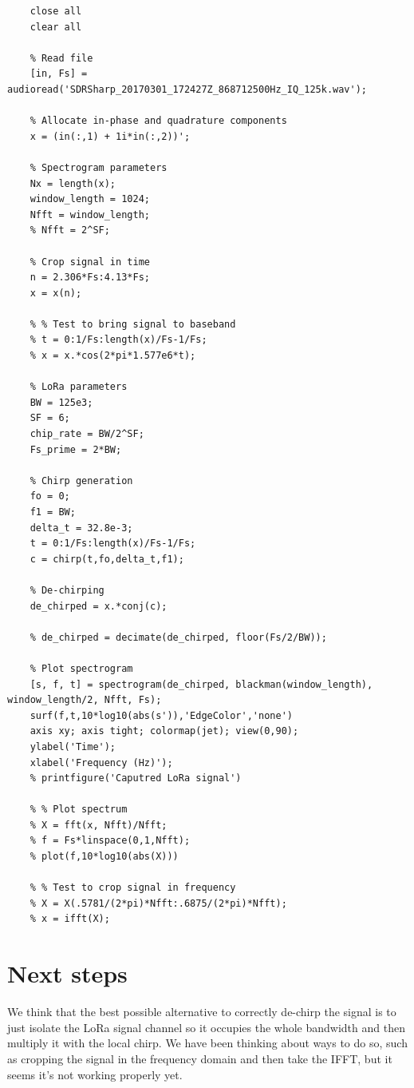 \documentclass{icmmcm}
\newenvironment{code}{\captionsetup{type=listing}}{}
\begin{document}
\begin{code}
\begin{verbatim}
    close all
    clear all
    
    % Read file
    [in, Fs] = audioread('SDRSharp_20170301_172427Z_868712500Hz_IQ_125k.wav');
    
    % Allocate in-phase and quadrature components
    x = (in(:,1) + 1i*in(:,2))';
    
    % Spectrogram parameters
    Nx = length(x);
    window_length = 1024;
    Nfft = window_length;
    % Nfft = 2^SF;
    
    % Crop signal in time
    n = 2.306*Fs:4.13*Fs;
    x = x(n);
    
    % % Test to bring signal to baseband
    % t = 0:1/Fs:length(x)/Fs-1/Fs;
    % x = x.*cos(2*pi*1.577e6*t);
    
    % LoRa parameters
    BW = 125e3;
    SF = 6;
    chip_rate = BW/2^SF;
    Fs_prime = 2*BW;
    
    % Chirp generation
    fo = 0;
    f1 = BW;
    delta_t = 32.8e-3;
    t = 0:1/Fs:length(x)/Fs-1/Fs;
    c = chirp(t,fo,delta_t,f1);
    
    % De-chirping
    de_chirped = x.*conj(c);
    
    % de_chirped = decimate(de_chirped, floor(Fs/2/BW));
    
    % Plot spectrogram
    [s, f, t] = spectrogram(de_chirped, blackman(window_length), window_length/2, Nfft, Fs);
    surf(f,t,10*log10(abs(s')),'EdgeColor','none')
    axis xy; axis tight; colormap(jet); view(0,90);
    ylabel('Time');
    xlabel('Frequency (Hz)');
    % printfigure('Caputred LoRa signal')
    
    % % Plot spectrum
    % X = fft(x, Nfft)/Nfft;
    % f = Fs*linspace(0,1,Nfft);
    % plot(f,10*log10(abs(X)))
    
    % % Test to crop signal in frequency
    % X = X(.5781/(2*pi)*Nfft:.6875/(2*pi)*Nfft);
    % x = ifft(X);
\end{verbatim}
\label{code:dechirp_try}
\end{code}

\section{Next steps}
We think that the best possible alternative to correctly de-chirp the signal is to just isolate the LoRa signal channel so it occupies the whole bandwidth and then multiply it with the local chirp. We have been thinking about ways to do so, such as cropping the signal in the frequency domain and then take the IFFT, but it seems it's not working properly yet.
\end{document}
